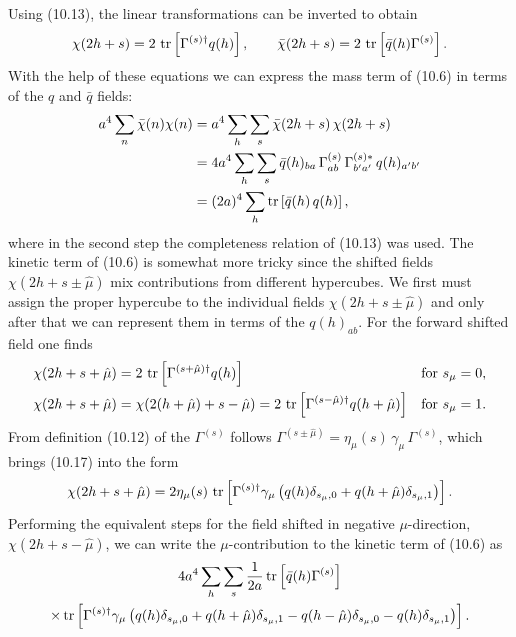 Using (10.13), the linear transformations can be inverted to obtain
\begin{equation}
  \chi(2h+s) = 2\,\operatorname{tr}\left[\Gamma^{(s)\dagger}q(h)\right] , \qquad
  \bar\chi(2h+s) = 2\,\operatorname{tr}\left[\bar q(h)\Gamma^{(s)}\right] .
\end{equation}
With the help of these equations we can express the mass term of (10.6) in
terms of the $q$ and $\bar q$ fields:
\begin{equation}
  \begin{split}
    a^4\sum_n \bar\chi(n)\chi(n)
    &= a^4\sum_h\sum_s \bar\chi(2h+s)\,\chi(2h+s) \\
    &= 4a^4\sum_h\sum_s
       \bar q(h)_{ba}\,\Gamma^{(s)}_{ab}\,\Gamma^{(s)*}_{b'a'}\,q(h)_{a'b'} \\
    &= (2a)^4\sum_h \operatorname{tr}\left[\bar q(h)\,q(h)\right] ,
  \end{split}
\end{equation}
where in the second step the completeness relation of (10.13) was used. The
kinetic term of (10.6) is somewhat more tricky since the shifted fields
$\chi(2h + s \pm \hat\mu)$ mix contributions from different hypercubes. We
first must assign the proper hypercube to the individual fields
$\chi(2h + s \pm \hat\mu)$ and only after that we can represent them in terms
of the $q(h)_{ab}$. For the forward shifted field one finds
\begin{equation}
  \begin{aligned}
    \chi(2h + s + \hat\mu)
    &= 2\,\operatorname{tr}\left[\Gamma^{(s+\hat\mu)\dagger}q(h)\right]
    && \text{for } s_\mu = 0 , \\
    \chi(2h + s + \hat\mu)
    &= \chi(2(h+\hat\mu) + s-\hat\mu)
    = 2\,\operatorname{tr}\left[\Gamma^{(s-\hat\mu)\dagger}q(h+\hat\mu)\right]
    && \text{for } s_\mu = 1 .
  \end{aligned}
\end{equation}
From definition (10.12) of the $\Gamma^{(s)}$ follows
$\Gamma^{(s\pm\hat\mu)} = \eta_\mu(s)\,\gamma_\mu\,\Gamma^{(s)}$, which brings
(10.17) into the form
\begin{equation}
  \chi(2h + s + \hat\mu) =
  2\eta_\mu(s)\,\operatorname{tr}\left[\Gamma^{(s)\dagger}\gamma_\mu
  \left(q(h)\delta_{s_\mu,0} + q(h+\hat\mu)\delta_{s_\mu,1}\right)\right] .
\end{equation}
Performing the equivalent steps for the field shifted in negative
$\mu$-direction, $\chi(2h + s - \hat\mu)$, we can write the $\mu$-contribution
to the kinetic term of (10.6) as
\begin{multline}
  4a^4\sum_h\sum_s \frac{1}{2a}
  \operatorname{tr}\left[\bar q(h)\Gamma^{(s)}\right] \\
  \times \operatorname{tr}\left[\Gamma^{(s)\dagger}\gamma_\mu
  \left(q(h)\delta_{s_\mu,0} + q(h+\hat\mu)\delta_{s_\mu,1}
  - q(h-\hat\mu)\delta_{s_\mu,0} - q(h)\delta_{s_\mu,1}\right)\right] .
\end{multline}
